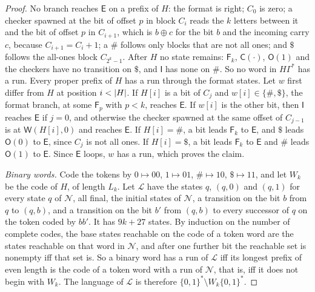 \begin{proof}
No branch reaches $\mathsf E$ on a prefix of $H$: the format is right; $C_0$ is
zero; a checker spawned at the bit of offset $p$ in block $C_i$ reads the $k$
letters between it and the bit of offset $p$ in $C_{i+1}$, which is
$b\oplus c$ for the bit $b$ and the incoming carry $c$, because $C_{i+1}=C_i+1$;
a $\#$ follows only blocks that are not all ones; and $\$$ follows the all-ones
block $C_{2^k-1}$. After $H$ no state remains: $\mathsf F_k$, $\mathsf C(\cdot)$,
$\mathsf O(1)$ and the checkers have no transition on $\$$, and $\mathsf I$ has
none on $\#$. So no word in $H\Gamma^*$ has a run. Every proper prefix of $H$
has a run through the format states. Let $w$ first differ from $H$ at
position $i<\lvert H\rvert$. If $H[i]$ is a bit of $C_j$ and $w[i]\in\{\#,\$\}$, the
format branch, at some $\mathsf F_p$ with $p<k$, reaches $\mathsf E$. If $w[i]$
is the other bit, then $\mathsf I$ reaches $\mathsf E$ if $j=0$, and otherwise
the checker spawned at the same offset of $C_{j-1}$ is at $\mathsf W(H[i],0)$
and reaches $\mathsf E$. If $H[i]=\#$, a bit leads $\mathsf F_k$ to $\mathsf E$,
and $\$$ leads $\mathsf O(0)$ to $\mathsf E$, since $C_j$ is not all ones. If
$H[i]=\$$, a bit leads $\mathsf F_k$ to $\mathsf E$ and $\#$ leads $\mathsf O(1)$
to $\mathsf E$. Since $\mathsf E$ loops, $w$ has a run, which proves the claim.

\emph{Binary words.} Code the tokens by $0\mapsto00$, $1\mapsto01$,
$\#\mapsto10$, $\$\mapsto11$, and let $W_k$ be the code of $H$, of length $L_k$.
Let $\mathcal L$ have the states $q$, $(q,0)$ and $(q,1)$ for every state $q$
of $\mathcal N$, all final, the initial states of $\mathcal N$, a transition on
the bit $b$ from $q$ to $(q,b)$, and a transition on the bit $b'$ from $(q,b)$
to every successor of $q$ on the token coded by $bb'$. It has $9k+27$ states.
By induction on the number of complete codes, the base states reachable on the
code of a token word are the states reachable on that word in $\mathcal N$, and
after one further bit the reachable set is nonempty iff that set is. So a
binary word has a run of $\mathcal L$ iff its longest prefix of even length is
the code of a token word with a run of $\mathcal N$, that is, iff it does not
begin with $W_k$. The language of $\mathcal L$ is therefore
$\{0,1\}^*\setminus W_k\{0,1\}^*$.


\end{proof}
